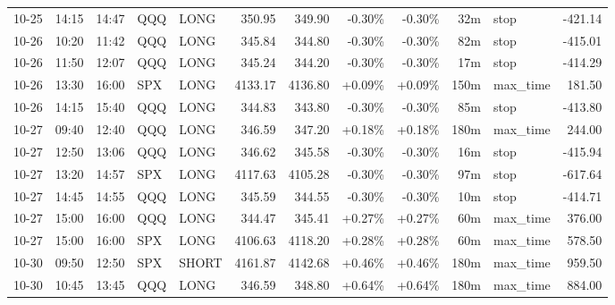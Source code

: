 \documentclass[11pt,a4paper,twoside]{article}
\begin{document}
\begin{center}
\begin{longtable}{>{\color{txtmain}}l l l l l r r r r r >{\color{txtmain}}l r}
10-25 & 14:15 & 14:47 & QQQ & LONG & 350.95 & 349.90 & \textcolor{lossred}{-0.30\%} & \textcolor{lossred}{-0.30\%} & 32m & stop & \textcolor{lossred}{-421.14} \\
10-26 & 10:20 & 11:42 & QQQ & LONG & 345.84 & 344.80 & \textcolor{lossred}{-0.30\%} & \textcolor{lossred}{-0.30\%} & 82m & stop & \textcolor{lossred}{-415.01} \\
10-26 & 11:50 & 12:07 & QQQ & LONG & 345.24 & 344.20 & \textcolor{lossred}{-0.30\%} & \textcolor{lossred}{-0.30\%} & 17m & stop & \textcolor{lossred}{-414.29} \\
10-26 & 13:30 & 16:00 & SPX & LONG & 4133.17 & 4136.80 & \textcolor{wingreen}{+0.09\%} & \textcolor{wingreen}{+0.09\%} & 150m & max\_time & \textcolor{wingreen}{181.50} \\
10-26 & 14:15 & 15:40 & QQQ & LONG & 344.83 & 343.80 & \textcolor{lossred}{-0.30\%} & \textcolor{lossred}{-0.30\%} & 85m & stop & \textcolor{lossred}{-413.80} \\
10-27 & 09:40 & 12:40 & QQQ & LONG & 346.59 & 347.20 & \textcolor{wingreen}{+0.18\%} & \textcolor{wingreen}{+0.18\%} & 180m & max\_time & \textcolor{wingreen}{244.00} \\
10-27 & 12:50 & 13:06 & QQQ & LONG & 346.62 & 345.58 & \textcolor{lossred}{-0.30\%} & \textcolor{lossred}{-0.30\%} & 16m & stop & \textcolor{lossred}{-415.94} \\
10-27 & 13:20 & 14:57 & SPX & LONG & 4117.63 & 4105.28 & \textcolor{lossred}{-0.30\%} & \textcolor{lossred}{-0.30\%} & 97m & stop & \textcolor{lossred}{-617.64} \\
10-27 & 14:45 & 14:55 & QQQ & LONG & 345.59 & 344.55 & \textcolor{lossred}{-0.30\%} & \textcolor{lossred}{-0.30\%} & 10m & stop & \textcolor{lossred}{-414.71} \\
10-27 & 15:00 & 16:00 & QQQ & LONG & 344.47 & 345.41 & \textcolor{wingreen}{+0.27\%} & \textcolor{wingreen}{+0.27\%} & 60m & max\_time & \textcolor{wingreen}{376.00} \\
10-27 & 15:00 & 16:00 & SPX & LONG & 4106.63 & 4118.20 & \textcolor{wingreen}{+0.28\%} & \textcolor{wingreen}{+0.28\%} & 60m & max\_time & \textcolor{wingreen}{578.50} \\
10-30 & 09:50 & 12:50 & SPX & SHORT & 4161.87 & 4142.68 & \textcolor{wingreen}{+0.46\%} & \textcolor{wingreen}{+0.46\%} & 180m & max\_time & \textcolor{wingreen}{959.50} \\
10-30 & 10:45 & 13:45 & QQQ & LONG & 346.59 & 348.80 & \textcolor{wingreen}{+0.64\%} & \textcolor{wingreen}{+0.64\%} & 180m & max\_time & \textcolor{wingreen}{884.00} \\

\end{longtable}
\end{center}
\end{document}
